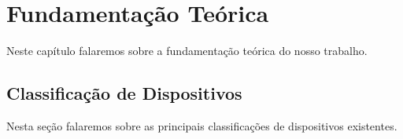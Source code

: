 \chapter{Fundamentação Teórica}

Neste capítulo falaremos sobre a fundamentação teórica do nosso trabalho.

\section{Classificação de Dispositivos}
Nesta seção falaremos sobre as principais classificações de dispositivos existentes.






